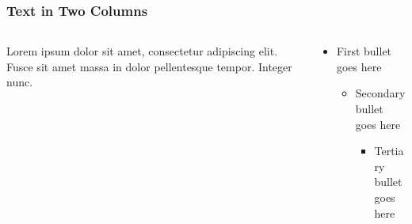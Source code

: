 \documentclass[10pt,xcolor={table,dvipsnames},t]{beamer}
\begin{document}
\begin{frame}
\frametitle{Text in Two Columns}

\begin{columns}[T]

\begin{column}{0.48\textwidth}
\small
Lorem ipsum dolor sit amet, consectetur adipiscing elit. Fusce sit amet massa in dolor pellentesque tempor. Integer nunc. 
\end{column}

\begin{column}{0.48\textwidth}
\begin{itemize}
\item First bullet goes here
  \begin{itemize}
  \item Secondary bullet goes here
    \begin{itemize}
    \item Tertiary bullet goes here
    \end{itemize}
  \end{itemize}
\end{itemize}
\end{column}

\end{columns}
\end{frame}
\end{document}
